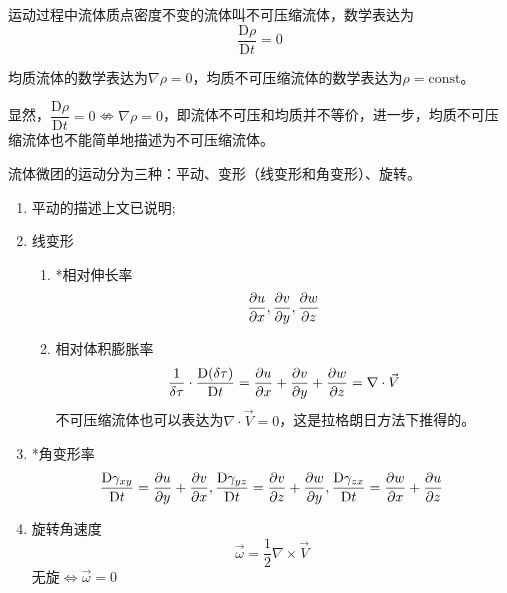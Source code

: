\label{3.3.3}

\begin{definition}[不可压缩流体]
	运动过程中流体质点密度不变的流体叫不可压缩流体，数学表达为
	\begin{equation}
		\dfrac{\mathrm{D}\rho}{\mathrm{D}t} = 0
	\end{equation}
\end{definition}

均质流体的数学表达为$\nabla \rho = 0$，均质不可压缩流体的数学表达为$\rho = \text{const}$。

显然，$\dfrac{\mathrm{D}\rho}{\mathrm{D}t} = 0 \nLeftrightarrow \nabla \rho = 0$，即流体不可压和均质并不等价，进一步，均质不可压缩流体也不能简单地描述为不可压缩流体。



流体微团的运动分为三种：平动、变形（线变形和角变形）、旋转。


\begin{enumerate}
	\item 平动的描述上文已说明;
	\item 线变形
	\begin{enumerate}
		\item *相对伸长率
		\begin{equation*}
			\pdv{u}{x}, \pdv{v}{y}, \pdv{w}{z}
		\end{equation*}
	    \item 相对体积膨胀率
	    \begin{equation*}
	    	\dfrac{1}{\delta \tau} \cdot \dfrac{\mathrm{D}(\delta \tau)}{\mathrm{D}t} = \pdv{u}{x} + \pdv{v}{y} + \pdv{w}{z} = \nabla \cdot \vec{V} 
	    \end{equation*}
        不可压缩流体也可以表达为$\nabla \cdot \vec{V} = 0$，这是拉格朗日方法下推得的。
	\end{enumerate}
    \item *角变形率
    \begin{equation*}
    	\dfrac{\mathrm{D}\gamma_{xy}}{\mathrm{D}t} = \pdv{u}{y} + \pdv{v}{x}, \dfrac{\mathrm{D}\gamma_{yz}}{\mathrm{D}t} = \pdv{v}{z} + \pdv{w}{y}, \dfrac{\mathrm{D}\gamma_{zx}}{\mathrm{D}t} = \pdv{w}{x} + \pdv{u}{z}
    \end{equation*}
    \item 旋转角速度
    \begin{equation*}
    	\vec{\omega} = \dfrac{1}{2} \nabla \times \vec{V}
    \end{equation*}
    无旋$\Leftrightarrow \vec{\omega} = 0$
\end{enumerate}

